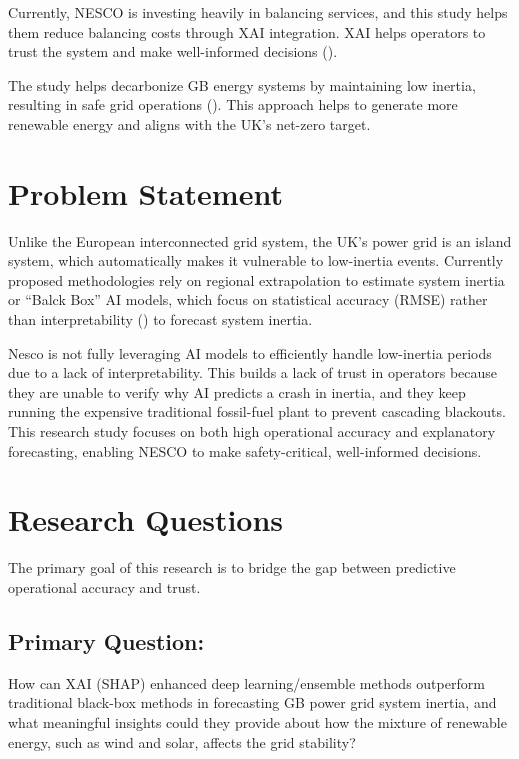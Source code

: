 \documentclass[12pt,a4paper,onecolumn]{article}
\begin{document}
Currently, NESCO is investing heavily in balancing services, and this study helps them reduce balancing costs through XAI integration. XAI helps operators to trust the system and make well-informed decisions (\cite{dey2025system}).

The study helps decarbonize GB energy systems by maintaining low inertia, resulting in safe grid operations (\cite{NESO2025Inertia}). This approach helps to generate more renewable energy and aligns with the UK's net-zero target.


\section{Problem Statement}
\label{sec:statement}
Unlike the European interconnected grid system, the UK’s power grid is an island system, which automatically makes it vulnerable to low-inertia events. Currently proposed methodologies rely on regional extrapolation to estimate system inertia or “Balck Box” AI models, which focus on statistical accuracy (RMSE) rather than interpretability (\cite{abouyehia2025evaluating}) to forecast system inertia.

Nesco is not fully leveraging AI models to efficiently handle low-inertia periods due to a lack of interpretability. This builds a lack of trust in operators because they are unable to verify why AI predicts a crash in inertia, and they keep running the expensive traditional fossil-fuel plant to prevent cascading blackouts. This research study focuses on both high operational accuracy and explanatory forecasting, enabling NESCO to make safety-critical, well-informed decisions. 


\section{Research Questions}
\label{sec:hypotheses}
The primary goal of this research is to bridge the gap between predictive operational accuracy and trust.

\subsection{Primary Question:}
How can XAI (SHAP) enhanced deep learning/ensemble methods outperform traditional black-box methods in forecasting GB power grid system inertia, and what meaningful insights could they provide about how the mixture of renewable energy, such as wind and solar, affects the grid stability?
\end{document}

